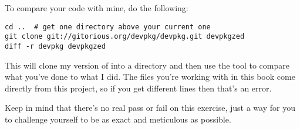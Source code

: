 To compare your code with mine, do the following:

\begin{lstlisting}
cd ..  # get one directory above your current one
git clone git://gitorious.org/devpkg/devpkg.git devpkgzed
diff -r devpkg devpkgzed
\end{lstlisting}

This will clone my version of  into a directory
 and then use the tool  to compare
what you've done to what I did.  The files you're working with in
this book come directly from this project, so if you get different
lines then that's an error.

Keep in mind that there's no real pass or fail on this exercise, just
a way for you to challenge yourself to be as exact and meticulous as
possible.

